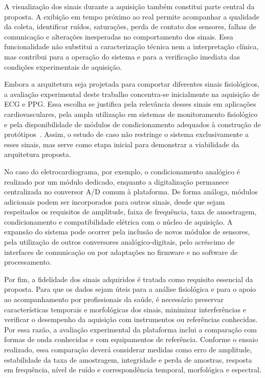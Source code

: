 \documentclass[a4paper,12pt]{fcte}
\begin{document}
A visualização dos sinais durante a aquisição também constitui parte central da proposta. A exibição em tempo próximo ao real permite acompanhar a qualidade da coleta, identificar ruídos, saturações, perda de contato dos sensores, falhas de comunicação e alterações inesperadas no comportamento dos sinais. Essa funcionalidade não substitui a caracterização técnica nem a interpretação clínica, mas contribui para a operação do sistema e para a verificação imediata das condições experimentais de aquisição.

Embora a arquitetura seja projetada para comportar diferentes sinais fisiológicos, a avaliação experimental deste trabalho concentra-se inicialmente na aquisição de ECG e PPG. Essa escolha se justifica pela relevância desses sinais em aplicações cardiovasculares, pela ampla utilização em sistemas de monitoramento fisiológico e pela disponibilidade de módulos de condicionamento adequados à construção de protótipos~\cite{hughes2023wearable_cardiovascular,charlton2022wearable_ppg}. Assim, o estudo de caso não restringe o sistema exclusivamente a esses sinais, mas serve como etapa inicial para demonstrar a viabilidade da arquitetura proposta.

No caso do eletrocardiograma, por exemplo, o condicionamento analógico é realizado por um módulo dedicado, enquanto a digitalização permanece centralizada no conversor A/D comum à plataforma. De forma análoga, módulos adicionais podem ser incorporados para outros sinais, desde que sejam respeitados os requisitos de amplitude, faixa de frequência, taxa de amostragem, condicionamento e compatibilidade elétrica com o núcleo de aquisição. A expansão do sistema pode ocorrer pela inclusão de novos módulos de sensores, pela utilização de outros conversores analógico-digitais, pelo acréscimo de interfaces de comunicação ou por adaptações no firmware e no software de processamento.

Por fim, a fidelidade dos sinais adquiridos é tratada como requisito essencial da proposta. Para que os dados sejam úteis para a análise fisiológica e para o apoio ao acompanhamento por profissionais da saúde, é necessário preservar características temporais e morfológicas dos sinais, minimizar interferências e verificar o desempenho da aquisição com instrumentos ou referências conhecidas. Por essa razão, a avaliação experimental da plataforma inclui a comparação com formas de onda conhecidas e com equipamentos de referência. Conforme o ensaio realizado, essa comparação deverá considerar medidas como erro de amplitude, estabilidade da taxa de amostragem, integridade e perda de amostras, resposta em frequência, nível de ruído e correspondência temporal, morfológica e espectral.
\end{document}
